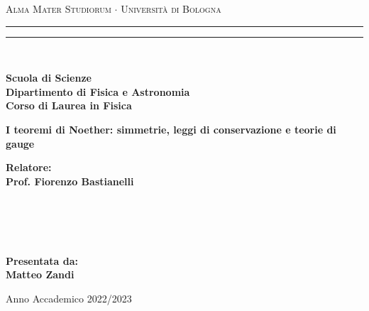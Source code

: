 \textwidth=450pt\oddsidemargin=0pt

\begin{titlepage}

\begin{center}
{{\Large{\textsc{Alma Mater Studiorum $\cdot$ Universit\`a di Bologna}}}} 
\rule[0.1cm]{15.8cm}{0.1mm}
\rule[0.5cm]{15.8cm}{0.6mm}
\\\vspace{3mm}

{\small{\bf Scuola di Scienze \\ 
Dipartimento di Fisica e Astronomia\\
Corso di Laurea in Fisica}}

\end{center}

\vspace{23mm}

\begin{center}
{\LARGE{\bf I teoremi di Noether: simmetrie, leggi di conservazione e teorie di gauge}}\\
\end{center}

\vspace{50mm} \par \noindent

\begin{minipage}[t]{0.47\textwidth}
{\large{\bf Relatore:\vspace{2mm}\\
Prof. Fiorenzo Bastianelli}\\\\
\bf
\vspace{2mm}\\
\\\\}
\end{minipage}
\hfill
\begin{minipage}[t]{0.47\textwidth}\raggedleft 
{\large{\bf Presentata da:
\vspace{2mm}\\
Matteo Zandi}}
\end{minipage}

\vspace{40mm}

\begin{center}

Anno Accademico 2022/2023
\end{center}

\end{titlepage}
